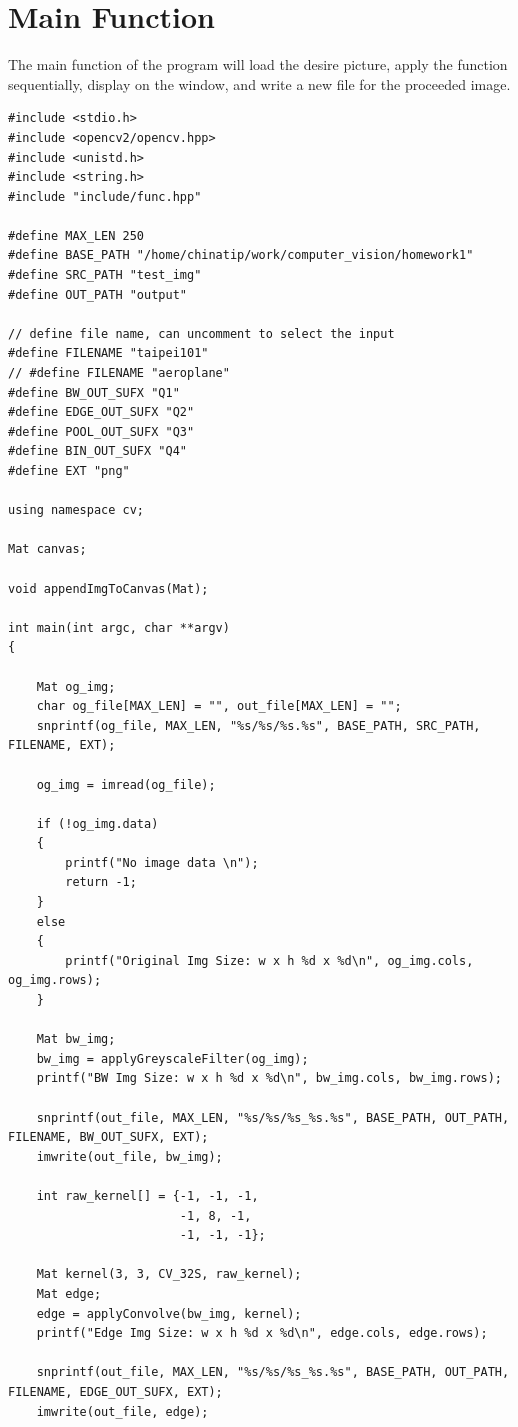\documentclass[12pt,a4paper]{report}
\begin{document}
\section{Main Function}
The main function of the program will load the desire picture, apply the function sequentially, display on the window, and write a new file for the proceeded image.
\begin{lstlisting}
#include <stdio.h>
#include <opencv2/opencv.hpp>
#include <unistd.h>
#include <string.h>
#include "include/func.hpp"

#define MAX_LEN 250
#define BASE_PATH "/home/chinatip/work/computer_vision/homework1"
#define SRC_PATH "test_img"
#define OUT_PATH "output"

// define file name, can uncomment to select the input
#define FILENAME "taipei101"
// #define FILENAME "aeroplane"
#define BW_OUT_SUFX "Q1"
#define EDGE_OUT_SUFX "Q2"
#define POOL_OUT_SUFX "Q3"
#define BIN_OUT_SUFX "Q4"
#define EXT "png"

using namespace cv;

Mat canvas;

void appendImgToCanvas(Mat);

int main(int argc, char **argv)
{

    Mat og_img;
    char og_file[MAX_LEN] = "", out_file[MAX_LEN] = "";
    snprintf(og_file, MAX_LEN, "%s/%s/%s.%s", BASE_PATH, SRC_PATH, FILENAME, EXT);

    og_img = imread(og_file);

    if (!og_img.data)
    {
        printf("No image data \n");
        return -1;
    }
    else
    {
        printf("Original Img Size: w x h %d x %d\n", og_img.cols, og_img.rows);
    }

    Mat bw_img;
    bw_img = applyGreyscaleFilter(og_img);
    printf("BW Img Size: w x h %d x %d\n", bw_img.cols, bw_img.rows);

    snprintf(out_file, MAX_LEN, "%s/%s/%s_%s.%s", BASE_PATH, OUT_PATH, FILENAME, BW_OUT_SUFX, EXT);
    imwrite(out_file, bw_img);

    int raw_kernel[] = {-1, -1, -1,
                        -1, 8, -1,
                        -1, -1, -1};

    Mat kernel(3, 3, CV_32S, raw_kernel);
    Mat edge;
    edge = applyConvolve(bw_img, kernel);
    printf("Edge Img Size: w x h %d x %d\n", edge.cols, edge.rows);

    snprintf(out_file, MAX_LEN, "%s/%s/%s_%s.%s", BASE_PATH, OUT_PATH, FILENAME, EDGE_OUT_SUFX, EXT);
    imwrite(out_file, edge);


\end{lstlisting}
\end{document}
